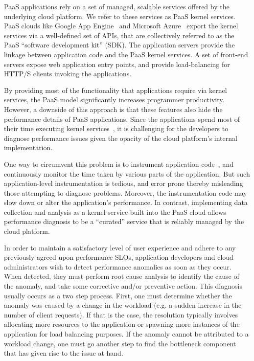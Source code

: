 PaaS applications rely on a set of managed, scalable services 
offered by the underlying cloud platform. We refer to these services as 
PaaS kernel services. PaaS clouds like Google
App Engine~\cite{gae} and Microsoft Azure~\cite{azure} export
the kernel services via a well-defined set of APIs, that are collectively
referred to as the PaaS ``software development kit'' (SDK). The application
servers provide the linkage between application code and the PaaS kernel
services. A set of front-end servers expose web application entry points, and
provide load-balancing for HTTP/S clients invoking the applications.

By providing most of the functionality that applications require via
kernel services, the PaaS model
significantly increases programmer productivity.
However, a downside of this approach is that these features also hide
the performance details of PaaS applications. 
Since the applications spend most of their time executing kernel 
services~\cite{Jayathilaka:2015:RTS:2806777.2806842},
it is challenging for the developers to diagnose performance issues given the
opacity of the cloud platform's internal implementation. 

One way to circumvent this 
problem is to instrument application code~\cite{newrelic,datadog,dynatrace}, 
and continuously monitor the time taken by various
parts of the application. But such application-level instrumentation is tedious, and
error prone thereby misleading those attempting to diagnose problems.
Moreover, the instrumentation code may slow down or alter the application's
performance. 
In contrast, implementing data collection and analysis as a kernel service 
built into the PaaS cloud allows 
performance diagnosis to be a ``curated'' service that is 
reliably managed by the cloud platform.

In order to maintain a satisfactory level of user experience and adhere to any previously
agreed upon performance SLOs, application developers and cloud administrators wish
to detect performance anomalies as soon as they occur. When detected, they
must perform root cause analysis to identify the cause of the anomaly, and take some
corrective and/or preventive action. 
This diagnosis usually occurs as a two step process. First, one must determine
whether the anomaly was caused by a change in the workload (e.g. a sudden 
increase in the number of client requests). If that is the case,
the resolution typically involves allocating more resources to the application or spawning
more instances of the application for load balancing purposes. If the anomaly cannot be 
attributed to a workload change, one must go another step to find the bottleneck component
that has given rise to the issue at hand.

